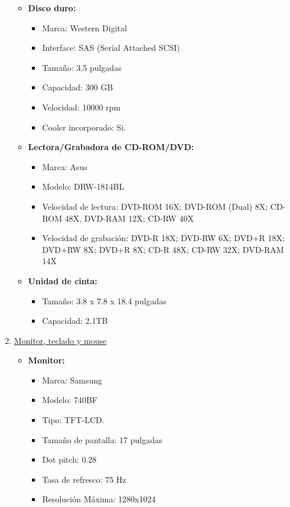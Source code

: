 \begin{enumerate}
\begin{itemize}
    \item \textbf{Disco duro:} 
    \begin{itemize}
      \item Marca: Western Digital
      \item Interface: SAS (Serial Attached SCSI)
      \item Tamaño: 3.5 pulgadas
      \item Capacidad: 300 GB
      \item Velocidad: 10000 rpm
      \item Cooler incorporado: Si.
    \end{itemize}
    
    \item \textbf{Lectora/Grabadora de CD-ROM/DVD:}
    \begin{itemize}
      \item Marca: Asus
      \item Modelo: DRW-1814BL
      \item Velocidad de lectura: DVD-ROM 16X; DVD-ROM (Dual) 8X; CD-ROM 48X, DVD-RAM 12X; CD-RW 40X
      \item Velocidad de grabación: DVD-R 18X; DVD-RW 6X; DVD+R 18X; DVD+RW 8X; DVD+R 8X; CD-R 48X; CD-RW 32X; DVD-RAM 14X
    \end{itemize}
    
    \item \textbf{Unidad de cinta:}
    \begin{itemize}
      \item Tamaño: 3.8 x 7.8 x 18.4 pulgadas
      \item Capacidad: 2.1TB
    \end{itemize}
  \end{itemize}
  
  \item \underline{Monitor, teclado y mouse}
  \begin{itemize}
    \item \textbf{Monitor:}
    \begin{itemize}
      \item Marca: Samsung
      \item Modelo: 740BF
      \item Tipo: TFT-LCD.
      \item Tamaño de pantalla: 17 pulgadas
      \item Dot pitch: 0.28
      \item Tasa de refresco: 75 Hz
      \item Resolución Máxima: 1280x1024
    \end{itemize}
    

\end{itemize}
\end{enumerate}
